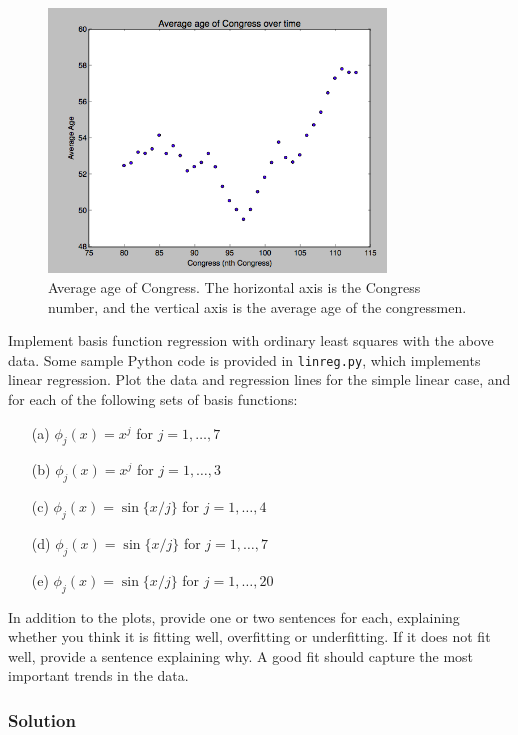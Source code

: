 \documentclass[submit]{harvardml}
\begin{document}
\begin{figure}[h]
\centering
\includegraphics[width=0.8\textwidth]{congress-ages}
\caption{Average age of Congress.  The horizontal axis is the Congress number, and the vertical axis is the average age of the congressmen.}
\label{fig:congress}
\end{figure}

\begin{problem}
Implement basis function regression with ordinary least squares with the above
data. Some sample Python code is provided in \verb|linreg.py|, which implements
linear regression.  Plot the data and regression lines for the simple linear
case, and for each of the following sets of basis functions:
\begin{itemize}
	\item[(a)] $\phi_j(x) = x^j$ for $j=1, \ldots, 7$
	\item[(b)] $\phi_j(x) = x^j$ for $j=1, \ldots, 3$
	\item[(c)] $\phi_j(x) = \sin\{ x / j \}$ for $j=1, \ldots, 4$
	\item[(d)] $\phi_j(x) = \sin\{ x / j \}$ for $j=1, \ldots, 7$
	\item[(e)] $\phi_j(x) = \sin\{ x / j \}$ for $j=1, \ldots, 20$
\end{itemize}
  In addition to the plots, provide one or two sentences for each, explaining
  whether you think it is fitting well, overfitting or underfitting.  If it does
  not fit well, provide a sentence explaining why. A good fit should capture the
  most important trends in the data.
	\end{problem}

\subsubsection*{Solution}
\end{document}
